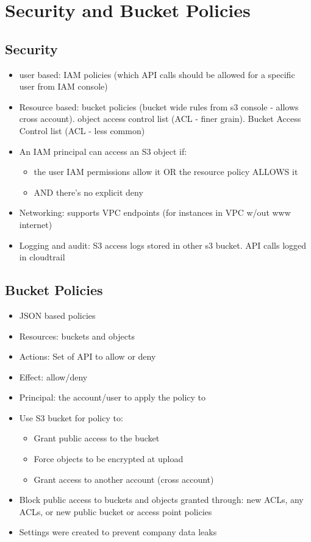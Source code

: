 \documentclass[]{scrartcl}
\begin{document}
\section{Security and Bucket Policies}

\subsection{Security}
\begin{itemize}
	\item user based: IAM policies (which API calls should be allowed for a specific user from IAM console)
	\item Resource based: bucket policies (bucket wide rules from s3 console - allows cross account). object access control list (ACL - finer grain). Bucket Access Control list (ACL - less common)
	\item An IAM principal can access an S3 object if: 
	\begin{itemize}
		\item the user IAM permissions allow it OR the resource policy ALLOWS it 
		\item AND there's no explicit deny
	\end{itemize}
	\item Networking:  supports VPC endpoints (for instances in VPC w/out www internet)
	\item Logging and audit: S3 access logs stored in other s3 bucket. API calls logged in cloudtrail
\end{itemize}

\subsection{Bucket Policies}
\begin{itemize}
	\item JSON based policies
	\item Resources: buckets and objects
	\item Actions: Set of API to allow or deny
	\item Effect: allow/deny
	\item Principal: the account/user to apply the policy to
	\item Use S3 bucket for policy to:
	\begin{itemize}
		\item Grant public access to the bucket
		\item Force objects to be encrypted at upload
		\item Grant access to another account (cross account)
	\end{itemize}
	\item Block public access to buckets and objects granted through: new ACLs, any ACLs, or new public bucket or access point policies
	\item Settings were created to prevent company data leaks
\end{itemize}
\end{document}

